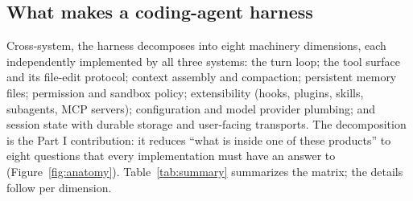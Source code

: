 \documentclass{article}
\begin{document}
\subsection{What makes a coding-agent harness}
\label{sec:components}

Cross-system, the harness decomposes into eight machinery dimensions, each
independently implemented by all three systems: the turn loop; the tool
surface and its file-edit protocol; context assembly and compaction;
persistent memory files; permission and sandbox policy; extensibility
(hooks, plugins, skills, subagents, MCP servers); configuration and model
provider plumbing; and session state with durable storage and user-facing
transports. The decomposition is the Part I contribution: it
reduces ``what is inside one of these products'' to eight questions that
every implementation must have an answer to (Figure~\ref{fig:anatomy}).
Table~\ref{tab:summary} summarizes the matrix; the details follow per
dimension.
\end{document}
